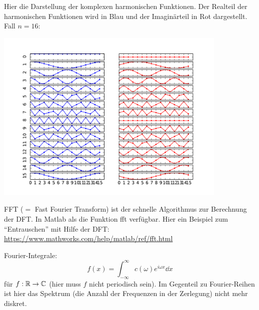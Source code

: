 \begin{bsp}
	Hier die Darstellung der komplexen harmonischen Funktionen. Der Realteil der harmonischen Funktionen wird in Blau und der Imaginärteil in Rot dargestellt. %
	Fall $n=16$:
	\begin{center}
		\includegraphics[width=30em]{pics/dft_harmonics_16.pdf}	
	\end{center}
\end{bsp}

\begin{bem}
	FFT ($=$ Fast Fourier Transform) ist der schnelle Algorithmus zur Berechnung der DFT. In Matlab als die Funktion fft verfügbar. Hier ein Beispiel zum ``Entrauschen'' mit Hilfe der DFT: 
	\url{https://www.mathworks.com/help/matlab/ref/fft.html} 
\end{bem} 

\begin{bem}
		Fourier-Integrale: 
		\[
			f(x) = \int_{-\infty}^\infty c(\omega) e^{i \omega x} \dd x
		\]
		für $f : \mathbb{R} \to \mathbb{C}$ (hier muss $f$ nicht periodisch sein). 
		Im Gegenteil zu Fourier-Reihen ist hier das Spektrum (die Anzahl der Frequenzen in der Zerlegung) nicht mehr diskret. 
\end{bem} 

